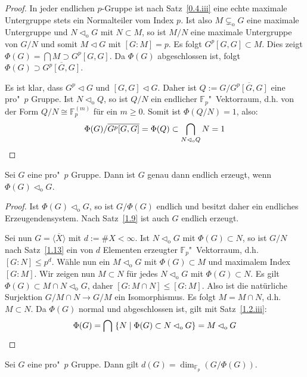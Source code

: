 \documentclass[11pt,a4paper,openany]{memoir}
\begin{document}
\begin{proof}
In jeder endlichen $p$-Gruppe ist nach Satz~\ref{0.4.iii} eine echte maximale Untergruppe stets ein Normalteiler vom Index $p$. Ist also $M\subsetneq_\text{o} G$ eine maximale Untergruppe und $N\lhd_\text{o} G$ mit $N\subset M$, so ist $M/N$ eine maximale Untergruppe von $G/N$ und somit $M\lhd G$ mit $[G:M]=p$. Es folgt $G^p[G,G]\subset M$. Dies zeigt $\Phi(G)=\bigcap M\supset G^p[G,G]$. Da $\Phi(G)$ abgeschlossen ist, folgt $\Phi(G)\supset \overline{G^p[G,G]}$.

Es ist klar, dass $G^p\lhd G$ und $[G,G]\lhd G$. Daher ist $Q:=G/\overline{G^p[G,G]}$ eine pro"~$p$ Gruppe. Ist $N\lhd_\text{o}Q$, so ist $Q/N$ ein endlicher $\mathbb{F}_p$"~Vek\-tor\-raum, d.h. von der Form $Q/N\cong  \mathbb{F}_p^{(m)}$ für ein $m\geq 0$. Somit ist $\Phi(Q/N)=1$, also:
\[\Phi(G) /\overline{G^p[G,G]}=\Phi(Q)\subset\bigcap_{N\lhd_\text{o}Q}N=1\qedhere \]
\end{proof}

\begin{proposition}\label{1.14}
Sei $G$ eine pro"~$p$ Gruppe. Dann ist $G$ genau dann endlich erzeugt, wenn $\Phi(G)\lhd_\text{o}G$.
\end{proposition}

\begin{proof}
Ist $\Phi(G)\lhd_\text{o}G$, so ist $G/\Phi(G)$ endlich und besitzt daher ein endliches Erzeugendensystem. Nach Satz~\ref{1.9} ist auch $G$ endlich erzeugt. 

Sei nun $G=\overline{\langle X\rangle}$ mit $d:=\#X<\infty$. Ist $N\lhd_\text{o}G$ mit $\Phi(G)\subset N$, so ist $G/N$ nach Satz~\ref{1.13} ein von $d$ Elementen erzeugter $\mathbb{F}_p$"~Vektorraum, d.h. $[G:N]\leq p^d$. Wähle nun ein $M\lhd_\text{o}G$ mit $\Phi(G)\subset M$ und maximalem Index $[G:M]$. Wir zeigen nun $M\subset N$ für jedes $N\lhd_\text{o}G$ mit $\Phi(G)\subset N$. Es gilt $\Phi(G)\subset M\cap N\lhd_\text{o}G$, daher $[G:M\cap N]\leq [G:M]$. Also ist die natürliche Surjektion $G/M\cap N\to G/M$ ein Isomorphismus. Es folgt $M=M\cap N$, d.h. $M\subset N$. Da $\Phi(G)$ normal und abgeschlossen ist, gilt mit Satz~\ref{1.2.iii}:
\[\Phi(G)=\bigcap\ \{N\mid \Phi(G)\subset N\lhd_\text{o} G\} = M \lhd_\text{o}G\qedhere \]
\end{proof}

\begin{corollary}\label{cor:1.19}
Sei $G$ eine pro"~$p$ Gruppe. Dann gilt $d(G)=\dim_{\mathbb{F}_p}(G/\Phi(G))$.
\end{corollary}
\end{document}
